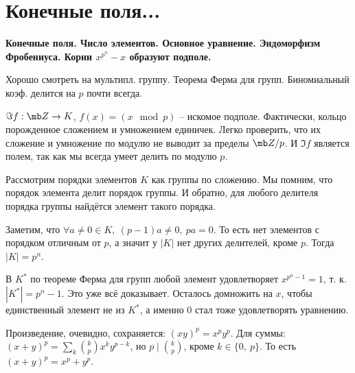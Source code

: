 \section{
	Конечные поля... %
}

\textbf{Конечные поля. Число элементов. Основное уравнение. Эндоморфизм Фробениуса. Корни $x^{p^n} - x$ образуют подполе.}

Хорошо смотреть на мультипл. группу. Теорема Ферма для групп. Биномиальный коэф. делится на $p$ почти всегда.


	\proof
	$\Im f : \mb Z \to K$, $f(x) = (x \mod p)$ -- искомое подполе. Фактически, кольцо порожденное сложением и умножением единичек. Легко проверить, что их сложение и умножение по модулю не выводит за пределы $\mb Z/p$. И $\Im f$ является полем, так как мы всегда умеет делить по модулю $p$.
	\endproof

\elm


	\proof
	Рассмотрим порядки элементов $K$ как группы по сложению. Мы помним, что порядок элемента делит порядок группы. И обратно, для любого делителя порядка группы найдётся элемент такого порядка.

	Заметим, что $\forall a \neq 0 \in K,\ (p - 1)a \neq 0,\ pa = 0$. То есть нет элементов с порядком отличным от $p$, а значит у $|K|$ нет других делителей, кроме $p$. Тогда $|K| = p^n$.
	\endproof

\elm

	
	\proof
	В $K^*$ по теореме Ферма для групп любой элемент удовлетворяет $x^{p^{n} - 1} = 1$, т. к. $|K^*| = p^n - 1$. Это уже всё доказывает. Осталось домножить на $x$, чтобы единственный элемент не из $K^*$, а именно $0$ стал тоже удовлетворять уравнению.
	\endproof

\elm


	\proof
	Произведение, очевидно, сохраняется: $(xy)^p = x^py^p$. Для суммы: $(x + y) ^ p = \sum\limits_k \binom{k}{p} x^ky^{p - k}$, но $p \mid \binom{k}{p}$, кроме $k \in \{0,\ p\}$. То есть $(x + y)^p = x^p + y^p$.

